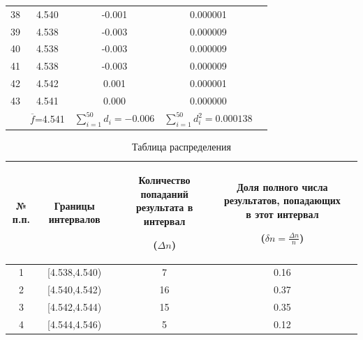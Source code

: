\begin{center}
\begin{tabular}{|c|c|c|c|c|}
38 &	4.540  &  -0.001 & 0.000001 \\
39 &	4.538  &  -0.003 & 0.000009 \\
40 &	4.538  &  -0.003 & 0.000009 \\
41 &	4.538  &  -0.003 & 0.000009 \\
42 &	4.542  &  0.001 & 0.000001 \\
43 &	4.541  &  0.000 & 0.000000 \\
\hline
   & $\overline{f}$=4.541 & $\sum_{i=1}^{50} d_i= -0.006$ & $\sum_{i=1}^{50}d_i^2=0.000138$\\
\hline
\end{tabular}
\end{center}

\begin{center}
\begin{table}[h!]
\centering
\caption{Таблица распределения}
\label{tabl:3}
\begin{tabular}{|c|c|c|c|c|}
\hline
\begin{minipage}{1cm}
    № п.п.
\end{minipage}&
\begin{minipage}{5cm}
\begin{center}
    Границы интервалов
\end{center}
\end{minipage} &
\begin{minipage}{5cm}
\begin{center}
    Количество попаданий результата в интервал

    ($\Delta n$)
\end{center}
\end{minipage} &
\begin{minipage}{5cm}
\begin{center}
    Доля полного числа результатов, попадающих в этот интервал
    
    ($\delta n=\frac{\Delta n}{n}$)
\end{center}
\end{minipage}\\
\hline
1 &  [4.538,4.540)  &  7 & 0.16 \\
2 &  [4.540,4.542)  &  16 & 0.37 \\
3 &  [4.542,4.544)  &  15 & 0.35 \\
4 &  [4.544,4.546)  &  5 & 0.12 \\
\hline
\end{tabular}
\end{table}
\end{center}

